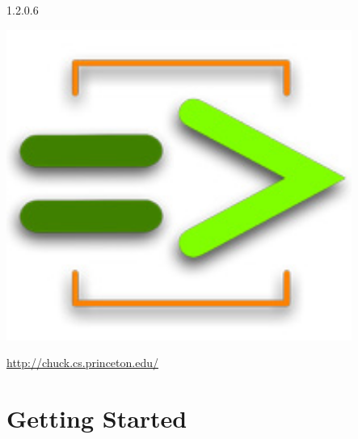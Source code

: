 \documentclass[11pt]{report}
\begin{document}
\thispagestyle{coverplain}
\vskip 6in
{\huge


}

\begin{center}
 1.2.0.6
\end{center}
\vskip 1.5in
\begin{center}
  \includegraphics[height=4in]{images/chuck_logo2.jpg}

  \vskip 1in

  \Large{\href{http://chuck.cs.princeton.edu/}{http://chuck.cs.princeton.edu/}}
\end{center}

\newpage







\tableofcontents
\clearpage

\pagestyle{fancy}

\part*{Getting Started}
\end{document}
